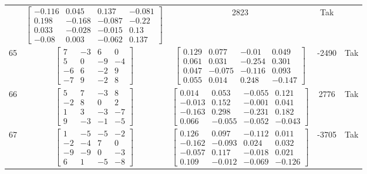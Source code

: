 \documentclass[a4paper,12pt]{article}
\begin{document}
\begin{tabular}{c c c c c}
&
$\begin{bmatrix} -0.116 & 0.045 & 0.137 & -0.081 \\ 0.198 & -0.168 & -0.087 & -0.22 \\ 0.033 & -0.028 & -0.015 & 0.13 \\ -0.08 & 0.003 & -0.062 & 0.137 \end{bmatrix}$
&
2823
&
Tak
\\
65
&
$\begin{bmatrix} 7 & -3 & 6 & 0 \\ 5 & 0 & -9 & -4 \\ -6 & 6 & -2 & 9 \\ -7 & 9 & -2 & 8 \end{bmatrix}$
&
$\begin{bmatrix} 0.129 & 0.077 & -0.01 & 0.049 \\ 0.061 & 0.031 & -0.254 & 0.301 \\ 0.047 & -0.075 & -0.116 & 0.093 \\ 0.055 & 0.014 & 0.248 & -0.147 \end{bmatrix}$
&
-2490
&
Tak
\\
66
&
$\begin{bmatrix} 5 & 7 & -3 & 8 \\ -2 & 8 & 0 & 2 \\ 1 & 3 & -3 & -7 \\ 9 & -3 & -1 & -5 \end{bmatrix}$
&
$\begin{bmatrix} 0.014 & 0.053 & -0.055 & 0.121 \\ -0.013 & 0.152 & -0.001 & 0.041 \\ -0.163 & 0.298 & -0.231 & 0.182 \\ 0.066 & -0.055 & -0.052 & -0.043 \end{bmatrix}$
&
2776
&
Tak
\\
67
&
$\begin{bmatrix} 1 & -5 & -5 & -2 \\ -2 & -4 & 7 & 0 \\ -9 & -9 & 0 & -3 \\ 6 & 1 & -5 & -8 \end{bmatrix}$
&
$\begin{bmatrix} 0.126 & 0.097 & -0.112 & 0.011 \\ -0.162 & -0.093 & 0.024 & 0.032 \\ -0.057 & 0.117 & -0.018 & 0.021 \\ 0.109 & -0.012 & -0.069 & -0.126 \end{bmatrix}$
&
-3705
&
Tak
\\

\end{tabular}
\end{document}
